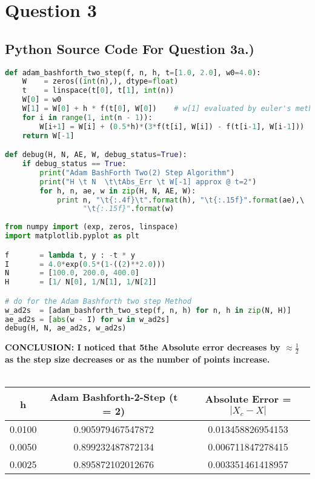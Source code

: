 \documentclass{article}
\begin{document}
\section*{ Question 3}
\subsection*{Python Source Code For Question 3a.) }
\begin{lstlisting}[language=Python]
def adam_bashforth_two_step(f, n, h, t=[1.0, 2.0], w0=4.0):
    W    = zeros((int(n),), dtype=float)
    t    = linspace(t[0], t[1], int(n))
    W[0] = w0
    W[1] = W[0] + h * f(t[0], W[0])    # w[1] evaluated by euler's method
    for i in range(1, int(n - 1)):
        W[i+1] = W[i] + (0.5*h)*(3*f(t[i], W[i]) - f(t[i-1], W[i-1]))
    return W[-1]

def debug(H, N, AE, W, debug_status=True):
    if debug_status == True:
        print("Adam BashForth Two(2) Step Algorithm")
        print("H \t N  \t\tAbs_Err \t W[-1] approx @ t=2")
        for h, n, ae, w in zip(H, N, AE, W):
            print n, "\t{:.4f}\t".format(h), "\t{:.15f}".format(ae),\ 
                  "\t{:.15f}".format(w)
            
from numpy import (exp, zeros, linspace)
import matplotlib.pyplot as plt

f       = lambda t, y : -t * y
I       = 4.0*exp(0.5*(1-((2)**2.0)))
N       = [100.0, 200.0, 400.0]
H       = [1/ N[0], 1/N[1], 1/N[2]]

# do for the Adam Bashforth two step Method
w_ad2s  = [adam_bashforth_two_step(f, n, h) for n, h in zip(N, H)]
ae_ad2s = [abs(w - I) for w in w_ad2s]
debug(H, N, ae_ad2s, w_ad2s)
\end{lstlisting}
\textbf{CONCLUSION: I noticed that 5the Absolute error decreases by $ \approx \frac{1}{2}$ as the step size decreases or as the number of points increase. \\ \\}
 \begin{center}
\begin{tabular}{ |c|c|c| } 
 \hline \hline
          h            & Adam Bashforth-2-Step (t = 2)  & Absolute Error = $|X_c - X|$ \\ 
 \hline \hline       
    0.0100  &   0.905979467547872 & 0.013458826954153\\
 \hline
    0.0050  &   0.899232487872134 & 0.006711847278415 \\
 \hline
   0.0025   &   0.895872102012676 & 0.003351461418957\\
 \hline
\end{tabular}
\end{center}
\pagebreak
\end{document}
